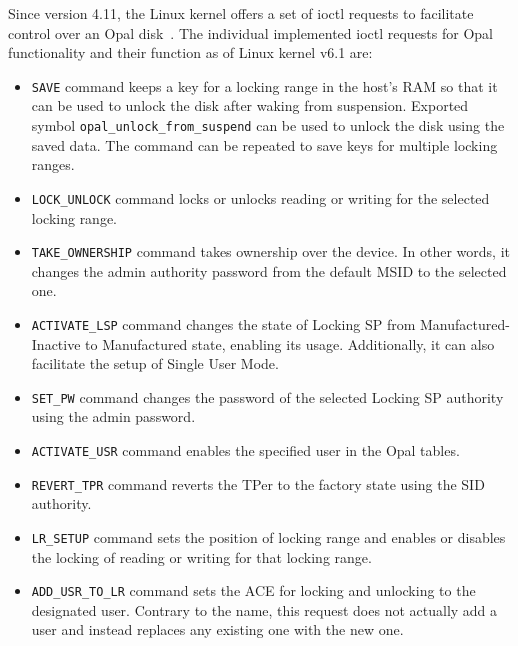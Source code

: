 Since version 4.11, the Linux kernel offers a set of ioctl requests to facilitate control over an Opal disk~\cite{linux-opal-introduction-mail}. 
The individual implemented ioctl requests for Opal functionality and their function as of Linux kernel v6.1 are:
\begin{itemize}
\item \verb|SAVE| command keeps a key for a locking range in the host's RAM so that it can be used to unlock the disk after waking from suspension. Exported symbol \verb|opal_unlock_from_suspend| can be used to unlock the disk using the saved data. The command can be repeated to save keys for multiple locking ranges. %
\item \verb|LOCK_UNLOCK| command locks or unlocks reading or writing for the selected locking range.
\item \verb|TAKE_OWNERSHIP| command takes ownership over the device. In other words, it changes the admin authority password from the default MSID to the selected one. 
\item \verb|ACTIVATE_LSP| command changes the state of Locking SP from Manufactured-Inactive to Manufactured state, enabling its usage. Additionally, it can also facilitate the setup of Single User Mode. 
\item \verb|SET_PW| command changes the password of the selected Locking SP authority using the admin password.
\item \verb|ACTIVATE_USR| command enables the specified user in the Opal tables.
\item \verb|REVERT_TPR| command reverts the TPer to the factory state using the SID authority.
\item \verb|LR_SETUP| command sets the position of locking range and enables or disables the locking of reading or writing for that locking range.
\item \verb|ADD_USR_TO_LR| command sets the ACE for locking and unlocking to the designated user. Contrary to the name, this request does not actually add a user and instead replaces any existing one with the new one. %

\end{itemize}
